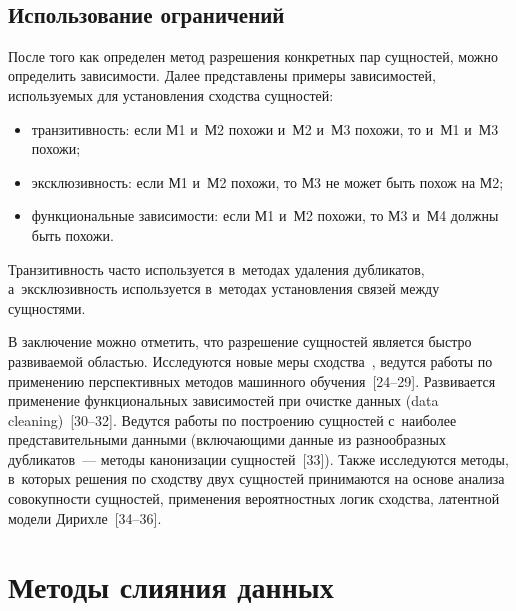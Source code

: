 \begin{multicols}{2}
{}

\begin{figure*}[b] %
\vspace*{1pt}
 \begin{center}
 \mbox{%
 \epsfxsize=157.76mm
 }
 \end{center}
 \vspace*{-9pt}
\end{figure*}


  \subsection{Использование ограничений} %

  После того как определен метод разрешения конкретных пар сущностей, можно
определить зависимости. Далее представлены примеры зависимостей, используемых для
установления сходства сущностей:
  \begin{itemize}
\item транзитивность: если М1 и~М2 похожи и~М2 и~М3 похожи, то и~М1 и~М3 похожи;
\item эксклюзивность: если М1 и~М2 похожи, то М3 не может быть похож на М2;
\item функциональные зависимости: если М1 и~М2 похожи, то М3 и~М4 должны быть
похожи.
\end{itemize}

  Транзитивность часто используется в~методах удаления дубликатов, а~эксклюзивность
используется в~методах установления связей между сущностями.

  В заключение можно отметить, что разрешение сущностей является быстро развиваемой
областью. Исследуются новые меры сходства~\cite{14-vov}, ведутся работы по применению
перспективных методов машинного обучения~[24--29]. Развивается применение
функциональных зависимостей при очистке данных (data cleaning)~[30--32]. Ведутся работы
по построению сущностей с~наиболее представительными данными (включающими данные
из разнообразных дубликатов~--- методы канонизации сущностей~[33]). Также исследуются
методы, в~которых решения по сходству двух сущностей принимаются на основе анализа
совокупности сущностей, применения вероятностных логик сходства, латентной модели
Дирихле~[34--36].

\section{Методы слияния данных}


\end{multicols}
